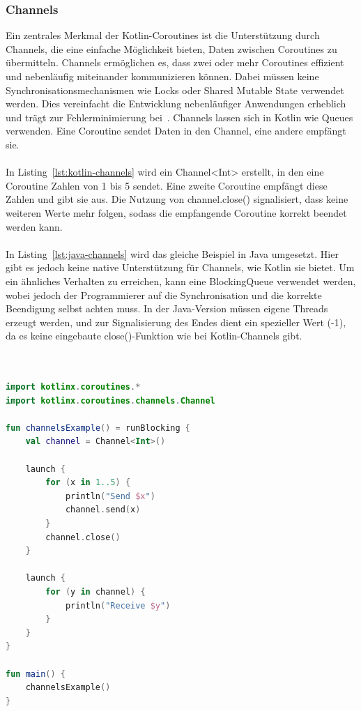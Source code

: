 \documentclass[11pt]{article}
\begin{document}
    \subsubsection{Channels}
    Ein zentrales Merkmal der Kotlin-Coroutines ist die Unterstützung durch Channels, die eine einfache Möglichkeit bieten, Daten zwischen Coroutines zu übermitteln.
    Channels ermöglichen es, dass zwei oder mehr Coroutines effizient und nebenläufig miteinander kommunizieren können.
    Dabei müssen keine Synchronisationsmechanismen wie Locks oder Shared Mutable State verwendet werden.
    Dies vereinfacht die Entwicklung nebenläufiger Anwendungen erheblich und trägt zur Fehlerminimierung bei~\cite[208]{kotlin-patterns}.
    Channels lassen sich in Kotlin wie Queues verwenden.
    Eine Coroutine sendet Daten in den Channel, eine andere empfängt sie.\\
    \\
    In Listing~\ref{lst:kotlin-channels} wird ein Channel<Int> erstellt, in den eine Coroutine Zahlen von 1 bis 5 sendet.
    Eine zweite Coroutine empfängt diese Zahlen und gibt sie aus.
    Die Nutzung von channel.close() signalisiert, dass keine weiteren Werte mehr folgen, sodass die empfangende Coroutine korrekt beendet werden kann.\\
    \\
    In Listing~\ref{lst:java-channels} wird das gleiche Beispiel in Java umgesetzt.
    Hier gibt es jedoch keine native Unterstützung für Channels, wie Kotlin sie bietet.
    Um ein ähnliches Verhalten zu erreichen, kann eine BlockingQueue verwendet werden, wobei jedoch der Programmierer auf die Synchronisation und die korrekte Beendigung selbst achten muss.
    In der Java-Version müssen eigene Threads erzeugt werden, und zur Signalisierung des Endes dient ein spezieller Wert (-1), da es keine eingebaute close()-Funktion wie bei Kotlin-Channels gibt.\\
    \\

    \begin{lstlisting}[language=Kotlin, caption={Channels.kt}, label={lst:kotlin-channels}]

import kotlinx.coroutines.*
import kotlinx.coroutines.channels.Channel

fun channelsExample() = runBlocking {
    val channel = Channel<Int>()

    launch {
        for (x in 1..5) {
            println("Send $x")
            channel.send(x)
        }
        channel.close()
    }

    launch {
        for (y in channel) {
            println("Receive $y")
        }
    }
}

fun main() {
    channelsExample()
}
    \end{lstlisting}
\end{document}
